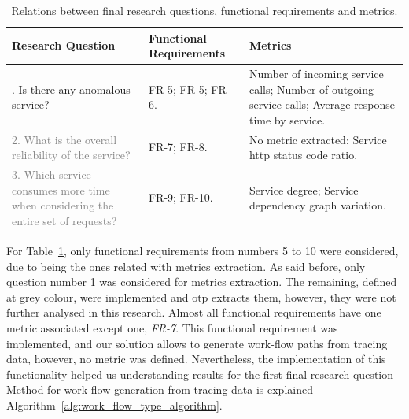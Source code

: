 \begin{table}[H]
    \caption{Relations between final research questions, functional requirements and metrics.}
    \label{table:research_questions_frs_and_metrics}
    \centering
    \begin{tabularx}{\linewidth} {
        |>{\hsize=0.75\hsize}X|
        >{\hsize=0.60\hsize}X|
        >{\hsize=1.65\hsize}X|}
        \hline
        \textbf{Research} \newline \textbf{Question}
         & \textbf{Functional} \newline \textbf{Requirements}
         & \textbf{Metrics}                                   \\ \hline \hline
        1. Is there any anomalous service?
         & FR-5; \newline
        FR-5; \newline
        FR-6.
         & Number of incoming service calls; \newline
        Number of outgoing service calls; \newline
        Average response time by service.                     \\ \hline
        \textcolor{gray}{2. What is the overall reliability of the service?}
         & FR-7; \newline
        FR-8.
         & No metric extracted; \newline
        Service \gls{http} status code ratio.                 \\ \hline
        \textcolor{gray}{3. Which service consumes more time when considering the entire set of requests?}
         & FR-9; \newline
        FR-10.
         & Service degree; \newline
        Service dependency graph variation.                   \\ \hline
    \end{tabularx}
\end{table}

For Table~\ref{table:research_questions_frs_and_metrics}, only functional requirements from numbers 5 to 10 were considered, due to being the ones related with metrics extraction. As said before, only question number 1 was considered for metrics extraction. The remaining, defined at grey colour, were implemented and \gls{otp} extracts them, however, they were not further analysed in this research. Almost all functional requirements have one metric associated except one, \emph{FR-7}. This functional requirement was implemented, and our solution allows to generate work-flow paths from tracing data, however, no metric was defined. Nevertheless, the implementation of this functionality helped us understanding results for the first final research question -- Method for work-flow generation from tracing data is explained Algorithm~\ref{alg:work_flow_type_algorithm}.


